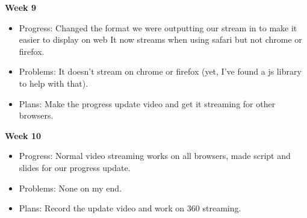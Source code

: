 \documentclass[onecolumn, draftclsnofoot,10pt, compsoc]{IEEEtran}
\begin{document}
        \newpage
        \textbf{Week 9}
        \begin{itemize}
            \item Progress: Changed the format we were outputting our stream in to make it easier to display on web It now streams when using safari but not chrome or firefox.
            \item Problems: It doesn't stream on chrome or firefox (yet, I've found a js library to help with that).
            \item Plans: Make the progress update video and get it streaming for other browsers.
        \end{itemize}
        \textbf{Week 10}
        \begin{itemize}
            \item Progress: Normal video streaming works on all browsers, made script and slides for our progress update.
            \item Problems: None on my end.
            \item Plans: Record the update video and work on 360 streaming.
        \end{itemize}
    
\end{document}
